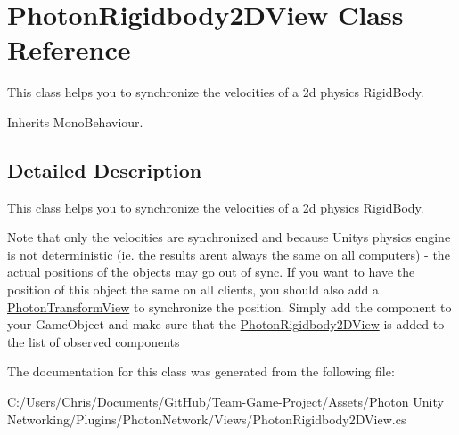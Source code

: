\hypertarget{class_photon_rigidbody2_d_view}{}\section{Photon\+Rigidbody2\+D\+View Class Reference}
\label{class_photon_rigidbody2_d_view}


This class helps you to synchronize the velocities of a 2d physics Rigid\+Body.  




Inherits Mono\+Behaviour.



\subsection{Detailed Description}
This class helps you to synchronize the velocities of a 2d physics Rigid\+Body. 

Note that only the velocities are synchronized and because Unitys physics engine is not deterministic (ie. the results aren\textquotesingle{}t always the same on all computers) -\/ the actual positions of the objects may go out of sync. If you want to have the position of this object the same on all clients, you should also add a \hyperlink{class_photon_transform_view}{Photon\+Transform\+View} to synchronize the position. Simply add the component to your Game\+Object and make sure that the \hyperlink{class_photon_rigidbody2_d_view}{Photon\+Rigidbody2\+D\+View} is added to the list of observed components 

The documentation for this class was generated from the following file\+:\begin{DoxyCompactItemize}
\item 
C\+:/\+Users/\+Chris/\+Documents/\+Git\+Hub/\+Team-\/\+Game-\/\+Project/\+Assets/\+Photon Unity Networking/\+Plugins/\+Photon\+Network/\+Views/Photon\+Rigidbody2\+D\+View.\+cs\end{DoxyCompactItemize}
